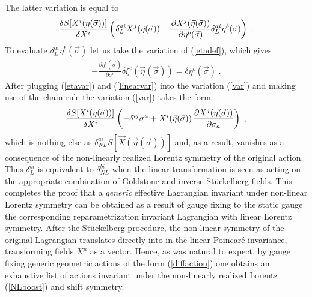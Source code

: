 \documentclass[%
 reprint,
 amsmath,amssymb,
 aps,
]{revtex4-1}
\begin{document}
The latter variation is equal to
\begin{gather}
\label{var}
 {\delta S[X^i(\eta(\vec{\sigma}))]\over \delta X^i}
  \left(\delta^{a i}_L X^j(\vec{\eta}(\vec{\sigma})) +
    \frac{\partial X^j (\vec{\eta}(\vec{\sigma}))}{\partial \eta^b(\vec{\sigma})}
    \delta^{a i}_L \eta^b(\vec{\sigma})\right) \; .
\end{gather}
To evaluate $\delta^{a i}_L \eta^b(\vec{\sigma})$ let us take the variation of (\ref{etadef}), which gives
\begin{eqnarray}
\label{etavar}
    - \frac{\partial \eta^b (\vec{\sigma})}{\partial \sigma^c} \delta \xi^c (\vec{\eta}(\vec{\sigma}))
    = \delta \eta^b(\vec{\sigma}) \; .
    \end{eqnarray}
    After plugging (\ref{etavar}) and (\ref{linearvar}) into the variation (\ref{var}) and making use of the chain rule the variation
     (\ref{var}) takes the form
\begin{eqnarray}
 {\delta S[X^i(\eta(\vec{\sigma}))]\over \delta X^i} \left( -\delta^{i j} \sigma^a + X^i(\vec{\eta}(\vec{\sigma})) \,
    \frac{\partial X^j(\vec{\eta}(\vec{\sigma}))}{\partial \sigma_a} \right)
    \; ,
    \nonumber
\end{eqnarray}
which is nothing else as $ \delta^{a i}_{NL} S \left[ \vec{X}(\vec{\eta}(\vec{\sigma}) )\right]$ and, as a result, vanishes as a consequence of
the non-linearly realized Lorentz symmetry of the original action.
Thus $\delta^{b i}_L$ is equivalent to $\delta^{b i}_{NL}$ when the linear transformation
is seen as acting on the appropriate combination of Goldstone and inverse
St\"uckelberg fields.
This completes the proof that a \emph{generic} effective Lagrangian invariant under non-linear Lorentz symmetry can
be obtained as a result of gauge fixing to the static gauge the corresponding reparametrization invariant Lagrangian
with linear Lorentz symmetry. After the St\"uckelberg procedure, the non-linear symmetry of the original Lagrangian
translates directly into in the linear Poincar\'e invariance, transforming fields $X^{\mu}$ as a vector.
Hence, as was natural to expect, by gauge fixing generic geometric actions of the form (\ref{diffaction}) one obtains an exhaustive list
of actions invariant under the non-linearly realized  Lorentz (\ref{NLboost}) and shift symmetry.

\end{document}
